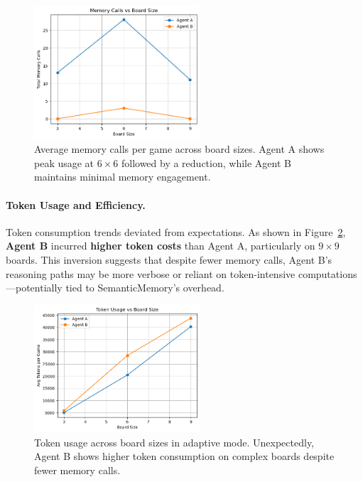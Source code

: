 \documentclass[10pt]{article}
\begin{document}
\begin{figure}[ht]
\centering
\includegraphics[width=0.55\textwidth]{figures/adaptive/memory_calls_vs_board_size.png}
\caption{Average memory calls per game across board sizes. Agent A shows peak usage at $6\times6$ followed by a reduction, while Agent B maintains minimal memory engagement.}
\label{fig:adaptive_memory_frequency}
\end{figure}

\paragraph{Token Usage and Efficiency.}
Token consumption trends deviated from expectations. As shown in Figure~\ref{fig:adaptive_token_usage}, \textbf{Agent B} incurred \textbf{higher token costs} than Agent A, particularly on $9\times9$ boards. This inversion suggests that despite fewer memory calls, Agent B's reasoning paths may be more verbose or reliant on token-intensive computations—potentially tied to SemanticMemory's overhead.

\begin{figure}[ht]
\centering
\includegraphics[width=0.55\textwidth]{figures/adaptive/token_usage_vs_board_size.png}
\caption{Token usage across board sizes in adaptive mode. Unexpectedly, Agent B shows higher token consumption on complex boards despite fewer memory calls.}
\label{fig:adaptive_token_usage}
\end{figure}
\end{document}
